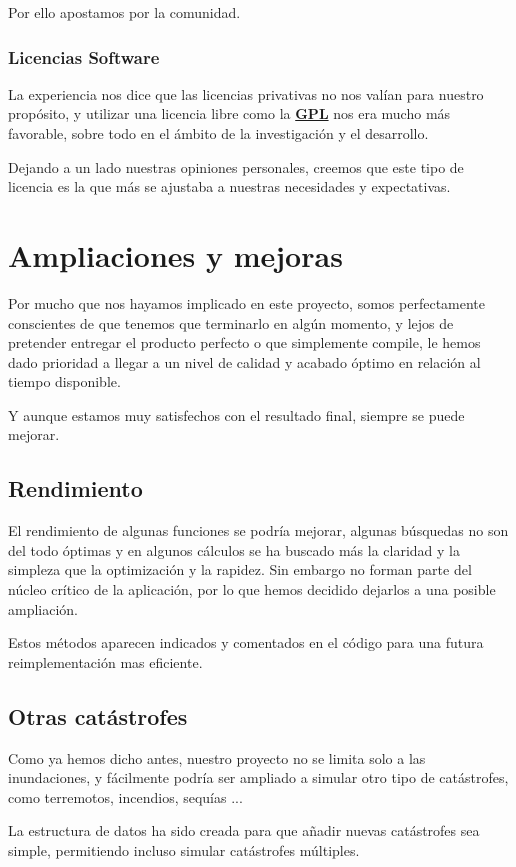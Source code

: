 Por ello apostamos por la comunidad.

\subsubsection*{Licencias Software}

La experiencia nos dice que las licencias privativas no nos valían para
nuestro propósito, y utilizar una licencia libre como la \hyperref[ap1]{\bf GPL}
nos era mucho más favorable, sobre todo en el ámbito de la investigación y el
desarrollo.

Dejando a un lado nuestras opiniones personales, creemos que este tipo de
licencia es la que más se ajustaba a nuestras necesidades y expectativas.

\section*{Ampliaciones y mejoras}

Por  mucho que nos hayamos implicado en este proyecto, somos perfectamente
conscientes de que tenemos que terminarlo en algún momento, y lejos de
pretender entregar el producto perfecto o que simplemente compile, le hemos
dado prioridad a llegar a un nivel de calidad y acabado óptimo en relación al
tiempo disponible.

Y aunque estamos muy satisfechos con el resultado final, siempre se puede
mejorar.
\subsection*{Rendimiento}
El rendimiento de algunas funciones se podría mejorar, algunas búsquedas no son
del todo óptimas y en algunos cálculos se ha buscado más la claridad y la
simpleza que la optimización y la rapidez. Sin embargo no forman parte del
núcleo crítico de la aplicación, por lo que hemos decidido dejarlos a una
posible ampliación. 

Estos métodos aparecen indicados y comentados en el código para una futura
reimplementación mas eficiente.
\subsection*{Otras catástrofes}
Como ya hemos dicho antes, nuestro proyecto no se limita solo a las
inundaciones, y fácilmente podría ser ampliado a simular otro tipo de
catástrofes, como terremotos, incendios, sequías ...

La estructura de datos ha sido creada para que añadir nuevas catástrofes sea
simple, permitiendo incluso simular catástrofes múltiples.
